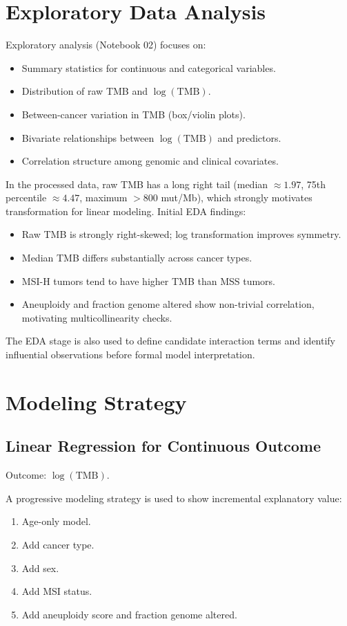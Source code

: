 \documentclass[11pt]{article}
\begin{document}
\section{Exploratory Data Analysis}

Exploratory analysis (Notebook 02) focuses on:
\begin{itemize}
    \item Summary statistics for continuous and categorical variables.
    \item Distribution of raw TMB and $\log(\text{TMB})$.
    \item Between-cancer variation in TMB (box/violin plots).
    \item Bivariate relationships between $\log(\text{TMB})$ and predictors.
    \item Correlation structure among genomic and clinical covariates.
\end{itemize}

In the processed data, raw TMB has a long right tail (median $\approx 1.97$, 75th percentile $\approx 4.47$, maximum $> 800$ mut/Mb), which strongly motivates transformation for linear modeling. Initial EDA findings:
\begin{itemize}
    \item Raw TMB is strongly right-skewed; log transformation improves symmetry.
    \item Median TMB differs substantially across cancer types.
    \item MSI-H tumors tend to have higher TMB than MSS tumors.
    \item Aneuploidy and fraction genome altered show non-trivial correlation, motivating multicollinearity checks.
\end{itemize}

The EDA stage is also used to define candidate interaction terms and identify influential observations before formal model interpretation.

\section{Modeling Strategy}

\subsection{Linear Regression for Continuous Outcome}
Outcome: $\log(\text{TMB})$.

A progressive modeling strategy is used to show incremental explanatory value:
\begin{enumerate}
    \item Age-only model.
    \item Add cancer type.
    \item Add sex.
    \item Add MSI status.
    \item Add aneuploidy score and fraction genome altered.
\end{enumerate}
\end{document}
